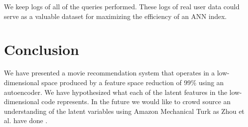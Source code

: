 \documentclass[conference]{IEEEtran}
\begin{document}
We keep logs of all of the queries performed.  These logs of real user data could serve as a valuable dataset for maximizing the efficiency of an ANN index.

\section{Conclusion} We have presented a movie recommendation system that
operates in a low-dimensional space produced by a feature space reduction of
99\% using an autoencoder. We have hypothesized what each of the latent
features in the low-dimensional code represents. In the future we would like
to crowd source an understanding of the latent variables using Amazon
Mechanical Turk as Zhou et al. have done \cite{zhou2014object}.
\vfill\break
\raggedright


\end{document}

